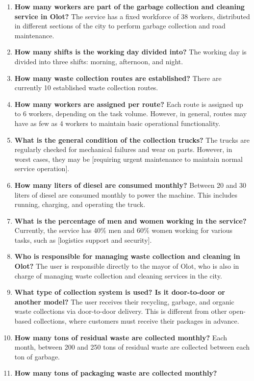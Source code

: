 \begin{enumerate}
\item \textbf{How many workers are part of the garbage collection and cleaning service in Olot?}
The service has a fixed workforce of 38 workers, distributed in different sections of the city to perform garbage collection and road maintenance.
\item \textbf{How many shifts is the working day divided into?}
The working day is divided into three shifts: morning, afternoon, and night.
\item \textbf{How many waste collection routes are established?}
There are currently 10 established waste collection routes.
\item \textbf{How many workers are assigned per route?}
Each route is assigned up to 6 workers, depending on the task volume. However, in general, routes may have as few as 4 workers to maintain basic operational functionality.
\item \textbf{What is the general condition of the collection trucks?}
The trucks are regularly checked for mechanical failures and wear on parts. However, in worst cases, they may be [requiring urgent maintenance to maintain normal service operation].
\item \textbf{How many liters of diesel are consumed monthly?}
Between 20 and 30 liters of diesel are consumed monthly to power the machine. This includes running, charging, and operating the truck.
\item \textbf{What is the percentage of men and women working in the service?}
Currently, the service has 40\% men and 60\% women working for various tasks, such as [logistics support and security].
\item \textbf{Who is responsible for managing waste collection and cleaning in Olot?}
The user is responsible directly to the mayor of Olot, who is also in charge of managing waste collection and cleaning services in the city.
\item \textbf{What type of collection system is used? Is it door-to-door or another model?}
The user receives their recycling, garbage, and organic waste collections via door-to-door delivery. This is different from other open-based collections, where customers must receive their packages in advance.
\item \textbf{How many tons of residual waste are collected monthly?}
Each month, between 200 and 250 tons of residual waste are collected between each ton of garbage.
\item \textbf{How many tons of packaging waste are collected monthly?}

\end{enumerate}
